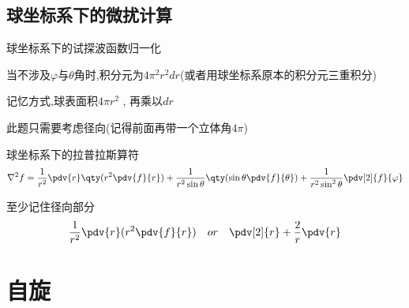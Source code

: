         \subsection{球坐标系下的微扰计算}
            \begin{formal}
                球坐标系下的试探波函数归一化

                当不涉及$\varphi$与$\theta$角时,积分元为$4\pi^{2} r ^{2} dr$(或者用球坐标系原本的积分元三重积分)
                
                记忆方式,球表面积$4\pi r^{2}$ , 再乘以$dr$
            \end{formal}

            此题只需要考虑径向(记得前面再带一个立体角$4\pi$)
            \begin{formal}
                球坐标系下的拉普拉斯算符
                $$ 
                \nabla^{2}f = \frac{1}{r^{2}} \pdv{r} \qty(r^{2} \pdv{f}{r} ) + 
                \frac{1}{r^{2} \sin{\theta}} \qty(\sin{\theta} \pdv{f}{\theta}) + 
                \frac{1}{r^{2} \sin^{2}{\theta}} \pdv[2]{f}{\varphi} 
                $$

                至少记住径向部分
                $$
                    \frac{1}{r^{2}} \pdv{r} (r^{2} \pdv{f}{r}) \quad or \quad \pdv[2]{r} + \frac{2}{r}\pdv{r}
                $$

            \end{formal}
            

        



















    \section{自旋}

